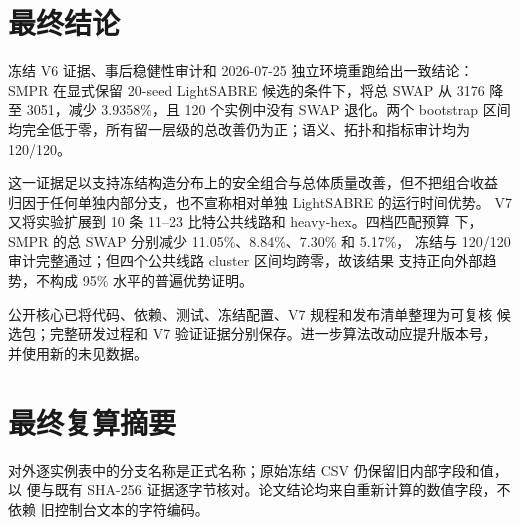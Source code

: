 \documentclass[11pt,a4paper]{article}
\begin{document}
\section{最终结论}

冻结 V6 证据、事后稳健性审计和 2026-07-25 独立环境重跑给出一致结论：
SMPR 在显式保留 20-seed LightSABRE 候选的条件下，将总 SWAP 从 3176
降至 3051，减少 3.9358\%，且 120 个实例中没有 SWAP 退化。两个 bootstrap
区间均完全低于零，所有留一层级的总改善仍为正；语义、拓扑和指标审计均为
120/120。

这一证据足以支持冻结构造分布上的安全组合与总体质量改善，但不把组合收益
归因于任何单独内部分支，也不宣称相对单独 LightSABRE 的运行时间优势。
V7 又将实验扩展到 10 条 11--23 比特公共线路和 heavy-hex。四档匹配预算
下，SMPR 的总 SWAP 分别减少 11.05\%、8.84\%、7.30\% 和 5.17\%，
冻结与 120/120 审计完整通过；但四个公共线路 cluster 区间均跨零，故该结果
支持正向外部趋势，不构成 95\% 水平的普遍优势证明。

公开核心已将代码、依赖、测试、冻结配置、V7 规程和发布清单整理为可复核
候选包；完整研发过程和 V7 验证证据分别保存。进一步算法改动应提升版本号，
并使用新的未见数据。

\appendix
\section{最终复算摘要}



\begin{notebox}
对外逐实例表中的分支名称是正式名称；原始冻结 CSV 仍保留旧内部字段和值，以
便与既有 SHA-256 证据逐字节核对。论文结论均来自重新计算的数值字段，不依赖
旧控制台文本的字符编码。
\end{notebox}
\end{document}

